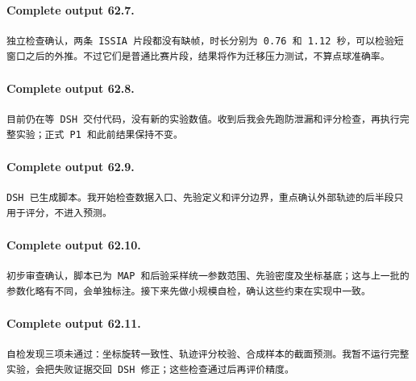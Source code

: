 \documentclass[UTF8,10pt]{ctexart}
\begin{document}
\paragraph{Complete output 62.7.}
\begin{Verbatim}[breaklines=true,breakanywhere=true,fontsize=\scriptsize,frame=single,framesep=2pt]
独立检查确认，两条 ISSIA 片段都没有缺帧，时长分别为 0.76 和 1.12 秒，可以检验短窗口之后的外推。不过它们是普通比赛片段，结果将作为迁移压力测试，不算点球准确率。
\end{Verbatim}

\paragraph{Complete output 62.8.}
\begin{Verbatim}[breaklines=true,breakanywhere=true,fontsize=\scriptsize,frame=single,framesep=2pt]
目前仍在等 DSH 交付代码，没有新的实验数值。收到后我会先跑防泄漏和评分检查，再执行完整实验；正式 P1 和此前结果保持不变。
\end{Verbatim}

\paragraph{Complete output 62.9.}
\begin{Verbatim}[breaklines=true,breakanywhere=true,fontsize=\scriptsize,frame=single,framesep=2pt]
DSH 已生成脚本。我开始检查数据入口、先验定义和评分边界，重点确认外部轨迹的后半段只用于评分，不进入预测。
\end{Verbatim}

\paragraph{Complete output 62.10.}
\begin{Verbatim}[breaklines=true,breakanywhere=true,fontsize=\scriptsize,frame=single,framesep=2pt]
初步审查确认，脚本已为 MAP 和后验采样统一参数范围、先验密度及坐标基底；这与上一批的参数化略有不同，会单独标注。接下来先做小规模自检，确认这些约束在实现中一致。
\end{Verbatim}

\paragraph{Complete output 62.11.}
\begin{Verbatim}[breaklines=true,breakanywhere=true,fontsize=\scriptsize,frame=single,framesep=2pt]
自检发现三项未通过：坐标旋转一致性、轨迹评分校验、合成样本的截面预测。我暂不运行完整实验，会把失败证据交回 DSH 修正；这些检查通过后再评价精度。
\end{Verbatim}
\end{document}
